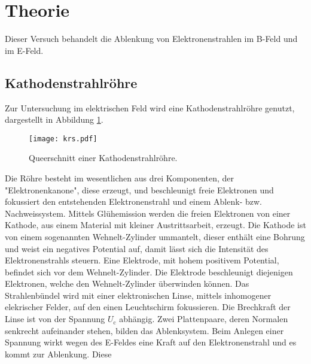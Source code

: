 \section{Theorie}
\label{sec:Theorie}
Dieser Versuch behandelt die Ablenkung von Elektronenstrahlen im B-Feld und
im E-Feld.
\subsection{Kathodenstrahlröhre}
Zur Untersuchung im elektrischen Feld wird eine Kathodenstrahlröhre genutzt,
dargestellt in Abbildung \ref{fig:krs}.
\begin{figure}
 \centering
 \texttt{[image: krs.pdf]}
 \caption{Queerschnitt einer Kathodenstrahlröhre.}
 \label{fig:krs}
\end{figure}
Die Röhre besteht im wesentlichen aus drei Komponenten, der "Elektronenkanone",
diese erzeugt, und beschleunigt freie Elektronen und
fokussiert den entstehenden Elektronenstrahl und einem
Ablenk- bzw. Nachweissystem.
Mittels Glühemission werden die freien Elektronen von einer Kathode, aus
einem Material mit kleiner Austrittsarbeit, erzeugt.
Die Kathode ist von einem sogenannten Wehnelt-Zylinder ummantelt, dieser enthält
eine Bohrung und weist ein negatives Potential auf, damit lässt sich die
Intensität des Elektronenstrahls steuern.
Eine Elektrode, mit hohem positivem Potential, befindet sich
vor dem Wehnelt-Zylinder. Die Elektrode beschleunigt diejenigen Elektronen,
welche den Wehnelt-Zylinder überwinden können.
Das Strahlenbündel wird mit einer elektronischen Linse, mittels
inhomogener elekrischer Felder, auf den einen Leuchtschirm fokussieren.
Die Brechkraft der Linse ist von  der Spannung $U_\mathrm{c}$ abhängig.
Zwei Plattenpaare, deren Normalen senkrecht aufeinander stehen, bilden
das Ablenksystem. Beim Anlegen einer Spannung wirkt wegen des E-Feldes
eine Kraft auf den Elektronenstrahl und es kommt zur Ablenkung.
Diese
